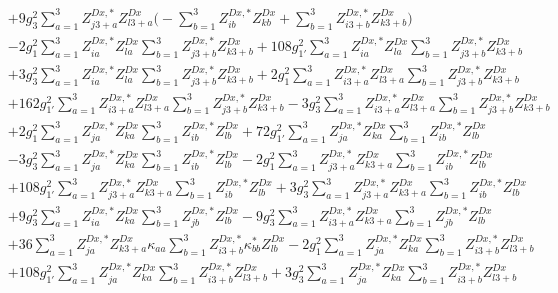 \begin{align}
 &+9 g_{3}^{2} \sum_{a=1}^{3}Z^{{Dx},*}_{j 3 + a} Z_{{l 3 + a}}^{Dx}  \Big(- \sum_{b=1}^{3}Z^{{Dx},*}_{i b} Z_{{k b}}^{Dx}   + \sum_{b=1}^{3}Z^{{Dx},*}_{i 3 + b} Z_{{k 3 + b}}^{Dx} \Big)\nonumber \\ 
 &-2 g_{1}^{2} \sum_{a=1}^{3}Z^{{Dx},*}_{i a} Z_{{l a}}^{Dx}  \sum_{b=1}^{3}Z^{{Dx},*}_{j 3 + b} Z_{{k 3 + b}}^{Dx}  +108 g_{1'}^{2} \sum_{a=1}^{3}Z^{{Dx},*}_{i a} Z_{{l a}}^{Dx}  \sum_{b=1}^{3}Z^{{Dx},*}_{j 3 + b} Z_{{k 3 + b}}^{Dx}  \nonumber \\ 
 &+3 g_{3}^{2} \sum_{a=1}^{3}Z^{{Dx},*}_{i a} Z_{{l a}}^{Dx}  \sum_{b=1}^{3}Z^{{Dx},*}_{j 3 + b} Z_{{k 3 + b}}^{Dx}  +2 g_{1}^{2} \sum_{a=1}^{3}Z^{{Dx},*}_{i 3 + a} Z_{{l 3 + a}}^{Dx}  \sum_{b=1}^{3}Z^{{Dx},*}_{j 3 + b} Z_{{k 3 + b}}^{Dx}  \nonumber \\ 
 &+162 g_{1'}^{2} \sum_{a=1}^{3}Z^{{Dx},*}_{i 3 + a} Z_{{l 3 + a}}^{Dx}  \sum_{b=1}^{3}Z^{{Dx},*}_{j 3 + b} Z_{{k 3 + b}}^{Dx}  -3 g_{3}^{2} \sum_{a=1}^{3}Z^{{Dx},*}_{i 3 + a} Z_{{l 3 + a}}^{Dx}  \sum_{b=1}^{3}Z^{{Dx},*}_{j 3 + b} Z_{{k 3 + b}}^{Dx}  \nonumber \\ 
 &+2 g_{1}^{2} \sum_{a=1}^{3}Z^{{Dx},*}_{j a} Z_{{k a}}^{Dx}  \sum_{b=1}^{3}Z^{{Dx},*}_{i b} Z_{{l b}}^{Dx}  +72 g_{1'}^{2} \sum_{a=1}^{3}Z^{{Dx},*}_{j a} Z_{{k a}}^{Dx}  \sum_{b=1}^{3}Z^{{Dx},*}_{i b} Z_{{l b}}^{Dx}  \nonumber \\ 
 &-3 g_{3}^{2} \sum_{a=1}^{3}Z^{{Dx},*}_{j a} Z_{{k a}}^{Dx}  \sum_{b=1}^{3}Z^{{Dx},*}_{i b} Z_{{l b}}^{Dx}  -2 g_{1}^{2} \sum_{a=1}^{3}Z^{{Dx},*}_{j 3 + a} Z_{{k 3 + a}}^{Dx}  \sum_{b=1}^{3}Z^{{Dx},*}_{i b} Z_{{l b}}^{Dx}  \nonumber \\ 
 &+108 g_{1'}^{2} \sum_{a=1}^{3}Z^{{Dx},*}_{j 3 + a} Z_{{k 3 + a}}^{Dx}  \sum_{b=1}^{3}Z^{{Dx},*}_{i b} Z_{{l b}}^{Dx}  +3 g_{3}^{2} \sum_{a=1}^{3}Z^{{Dx},*}_{j 3 + a} Z_{{k 3 + a}}^{Dx}  \sum_{b=1}^{3}Z^{{Dx},*}_{i b} Z_{{l b}}^{Dx}  \nonumber \\ 
 &+9 g_{3}^{2} \sum_{a=1}^{3}Z^{{Dx},*}_{i a} Z_{{k a}}^{Dx}  \sum_{b=1}^{3}Z^{{Dx},*}_{j b} Z_{{l b}}^{Dx}  -9 g_{3}^{2} \sum_{a=1}^{3}Z^{{Dx},*}_{i 3 + a} Z_{{k 3 + a}}^{Dx}  \sum_{b=1}^{3}Z^{{Dx},*}_{j b} Z_{{l b}}^{Dx}  \nonumber \\ 
 &+36 \sum_{a=1}^{3}Z^{{Dx},*}_{j a} Z_{{k 3 + a}}^{Dx} \kappa_{{a a}}  \sum_{b=1}^{3}Z^{{Dx},*}_{i 3 + b} \kappa^*_{b b} Z_{{l b}}^{Dx}  -2 g_{1}^{2} \sum_{a=1}^{3}Z^{{Dx},*}_{j a} Z_{{k a}}^{Dx}  \sum_{b=1}^{3}Z^{{Dx},*}_{i 3 + b} Z_{{l 3 + b}}^{Dx}  \nonumber \\ 
 &+108 g_{1'}^{2} \sum_{a=1}^{3}Z^{{Dx},*}_{j a} Z_{{k a}}^{Dx}  \sum_{b=1}^{3}Z^{{Dx},*}_{i 3 + b} Z_{{l 3 + b}}^{Dx}  +3 g_{3}^{2} \sum_{a=1}^{3}Z^{{Dx},*}_{j a} Z_{{k a}}^{Dx}  \sum_{b=1}^{3}Z^{{Dx},*}_{i 3 + b} Z_{{l 3 + b}}^{Dx}  \nonumber \\ 

\end{align}
